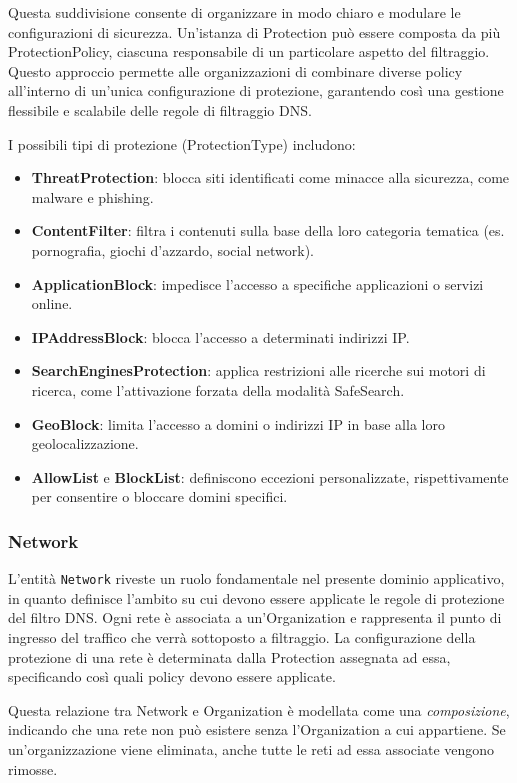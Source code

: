 Questa suddivisione consente di organizzare in modo chiaro e modulare le configurazioni di sicurezza. Un'istanza di Protection può essere composta da più ProtectionPolicy, ciascuna responsabile di un particolare aspetto del filtraggio. Questo approccio permette alle organizzazioni di combinare diverse policy all'interno di un'unica configurazione di protezione, garantendo così una gestione flessibile e scalabile delle regole di filtraggio DNS.

I possibili tipi di protezione (ProtectionType) includono:
\begin{itemize}
  \item \textbf{ThreatProtection}: blocca siti identificati come minacce alla sicurezza, come malware e phishing.
  \item \textbf{ContentFilter}: filtra i contenuti sulla base della loro categoria tematica (es. pornografia, giochi d'azzardo, social network).
  \item \textbf{ApplicationBlock}: impedisce l’accesso a specifiche applicazioni o servizi online.
  \item \textbf{IPAddressBlock}: blocca l'accesso a determinati indirizzi IP.
  \item \textbf{SearchEnginesProtection}: applica restrizioni alle ricerche sui motori di ricerca, come l'attivazione forzata della modalità SafeSearch.
  \item \textbf{GeoBlock}: limita l’accesso a domini o indirizzi IP in base alla loro geolocalizzazione.
  \item \textbf{AllowList} e \textbf{BlockList}: definiscono eccezioni personalizzate, rispettivamente per consentire o bloccare domini specifici.
\end{itemize}

\subsubsection{Network}
L'entità \texttt{Network} riveste un ruolo fondamentale nel presente dominio applicativo, in quanto definisce l’ambito su cui devono essere applicate le regole di protezione del filtro DNS. Ogni rete è associata a un'Organization e rappresenta il punto di ingresso del traffico che verrà sottoposto a filtraggio. La configurazione della protezione di una rete è determinata dalla Protection assegnata ad essa, specificando così quali policy devono essere applicate.

Questa relazione tra Network e Organization è modellata come una \textit{composizione}, indicando che una rete non può esistere senza l’Organization a cui appartiene. Se un'organizzazione viene eliminata, anche tutte le reti ad essa associate vengono rimosse.

